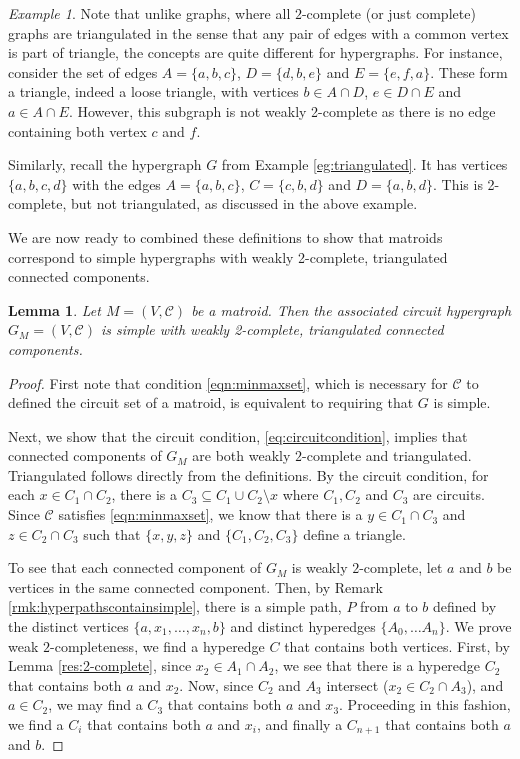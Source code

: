 \documentclass[11pt]{article}
\newcommand{\sC}{\mathscr{C}}
\newtheorem{lem}[thm]{Lemma}
\theoremstyle{remark}
\newtheorem{eg}[thm]{Example}
\theoremstyle{definition}
\begin{document}
\begin{eg}
	\label{eg:triangle!=2complete}
Note that unlike graphs, where all $2$-complete (or just complete) graphs are triangulated in the sense that any pair of edges with a common vertex is part of triangle, the concepts are quite different for hypergraphs. For instance, consider the set of edges $A = \{a, b, c\}$, $D = \{d, b, e\}$ and $E = \{e, f, a\}$. These form a triangle, indeed a loose triangle, with vertices $b \in A \cap D$, $e \in D \cap E$ and $a \in A\cap E$. However, this subgraph is not weakly 2-complete as there is no edge containing both vertex $c$ and $f$. 

Similarly, recall the hypergraph $G$ from Example \ref{eg:triangulated}. It has  vertices $\{a, b, c, d\}$ with the edges $A = \{a, b, c\}$, $C = \{ c, b, d\}$ and $D = \{a, b, d\}$. This is 2-complete, but not triangulated, as discussed in the above example.   
\end{eg}

We are now ready to combined these definitions to show that  matroids correspond to simple hypergraphs with weakly 2-complete, triangulated connected components. 

\begin{lem}\label{res:matroidhypergraphs}
    Let $M = (V, \sC)$ be a matroid. Then the associated circuit hypergraph $G_M = (V, \sC)$ is simple with weakly 2-complete, triangulated connected components. 
\end{lem}
\begin{proof} 
	First note that condition \eqref{eqn:minmaxset}, which is necessary for $\sC$ to defined the circuit set of a matroid, is equivalent to requiring that $G$ is simple.
	
	Next, we show that the circuit condition, \eqref{eq:circuitcondition}, implies that connected components of $G_M$ are both weakly $2$-complete and triangulated. Triangulated follows directly from the definitions. By the circuit condition, for each $x \in C_1 \cap C_2$, there is a $C_3 \subseteq C_1 \cup C_2 \setminus x$ where $C_1, C_2$ and $C_3$ are circuits. Since $\sC$ satisfies \eqref{eqn:minmaxset}, we know that there is a $y \in C_1 \cap C_3$ and $z \in C_2 \cap C_3$ such that $\{x, y, z\}$ and $\{C_1, C_2, C_3\}$ define a triangle. 
	
	To see that each connected component of $G_M$ is weakly $2$-complete, let $a$ and $b$ be vertices in the same connected component. Then, by Remark \ref{rmk:hyperpathscontainsimple}, there is a simple path, $P$ from $a$ to $b$ defined by the distinct vertices $\{a, x_1, \ldots , x_n, b\}$ and distinct hyperedges $\{A_0 , \ldots A_n\}$. We prove weak $2$-completeness, we find a hyperedge $C$ that contains both vertices. First, by Lemma \ref{res:2-complete}, since $x_2 \in A_1 \cap A_2$, we see that there is a hyperedge $C_2$ that contains both $a$ and $x_2$. Now, since $C_2$ and $A_3$ intersect ($x_2 \in C_2 \cap A_3$), and $a \in C_2$, we may find a $C_3$ that contains both $a$ and $x_3$. Proceeding in this fashion, we find a $C_{i}$ that contains both $a$ and $x_i$, and finally a $C_{n+1}$ that contains both $a$ and $b$. 
\end{proof}
\end{document}
